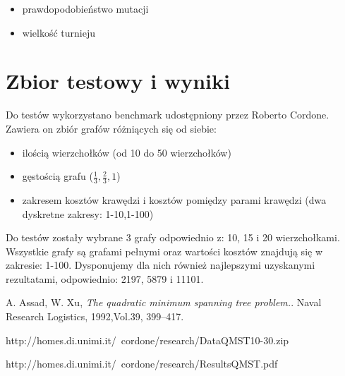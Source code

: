 \documentclass[12pt]{article}
\newcounter{lastnote}
\begin{document}
\begin{itemize}
  \item prawdopodobieństwo mutacji
  \item wielkość turnieju
\end{itemize}




 \section{Zbior testowy i wyniki}


 Do testów wykorzystano benchmark udostępniony przez Roberto Cordone\cite{Bechmark}. Zawiera on zbiór grafów różniących się od siebie:
 
 \begin{itemize}
  \item ilością wierzchołków (od 10 do 50 wierzchołków)
  \item gęstością grafu ($\frac{1}{3}, \frac{2}{3}, 1$)
  \item zakresem kosztów krawędzi i kosztów pomiędzy parami krawędzi (dwa dyskretne zakresy: 1-10,1-100)
\end{itemize}

Do testów zostały wybrane 3 grafy odpowiednio z: 10, 15 i 20 wierzchołkami. Wszystkie grafy są grafami pełnymi oraz wartości kosztów znajdują się w zakresie: 1-100. Dysponujemy dla nich również najlepszymi uzyskanymi rezultatami, odpowiednio: 2197, 5879 i 11101\cite{Results}.





  A. Assad, W. Xu,
  \emph{The quadratic minimum spanning tree problem.}.
  Naval Research Logistics, 1992,Vol.39, 399–417.
  
  http://homes.di.unimi.it/~cordone/research/DataQMST10-30.zip
  
  
  http://homes.di.unimi.it/~cordone/research/ResultsQMST.pdf








\clearpage
\end{document}
